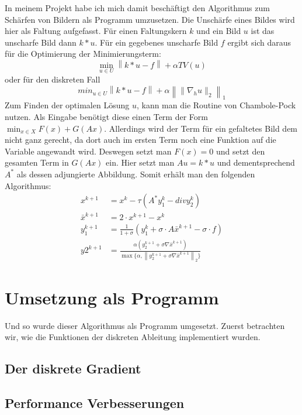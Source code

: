 \documentclass{article}
\theoremstyle{case}
\newcommand{\norm}[1]{\left\lVert#1\right\rVert}
\begin{document}
In meinem Projekt habe ich mich damit beschäftigt den Algorithmus zum Schärfen von Bildern als Programm umzusetzen. Die Unschärfe eines Bildes wird hier als Faltung aufgefasst. Für einen Faltungskern $k$ und ein Bild $u$ ist das unscharfe Bild dann $k*u$. Für ein gegebenes unscharfe Bild $f$ ergibt sich daraus für die Optimierung der Minimierungsterm:
\begin{equation}
\min_{u\in U}\norm{k*u - f} + \alpha TV(u)
\end{equation}
oder für den diskreten Fall
\begin{equation}
min_{u\in U}\norm{k*u - f} + \alpha \norm{\lVert \nabla_{h} u \rVert_{2}}_{1}
\end{equation}
Zum Finden der optimalen Lösung $u$, kann man die Routine von Chambole-Pock nutzen. Als Eingabe benötigt diese einen Term der Form $\min_{x\in X} F(x) + G(Ax)$. Allerdings wird der Term für ein gefaltetes Bild dem nicht ganz gerecht, da dort auch im ersten Term noch eine Funktion auf die Variable angewandt wird. Deswegen setzt man $F(x) = 0$ und setzt den gesamten Term in $G(Ax)$ ein. Hier setzt man $Au = k*u$ und dementsprechend $A^{*}$ als dessen adjungierte Abbildung. Somit erhält man den folgenden Algorithmus:
\begin{align*}
x^{k+1} &= x^{k} - \tau (A^{*}y_{1}^{k} - div y_{2}^{k}) \\
\bar{x}^{k+1} &= 2\cdot x^{k+1} - x^{k} \\
y_{1}^{k+1} &= \frac{1}{1+\sigma} (y_{1}^{k} + \sigma\cdot A \bar{x}^{k+1} - \sigma\cdot f) \\
y{2}^{k+1} &= \frac{\alpha (y_{2}^{k+1} + \sigma \nabla \bar{x}^{k+1} )}{\max\{\alpha, \norm{y_{2}^{k+1} + \sigma \nabla \bar{x}^{k+1} }_{2}\}}
\end{align*}


\section{Umsetzung als Programm}
Und so wurde dieser Algorithmus als Programm umgesetzt.\newline
Zuerst betrachten wir, wie die Funktionen der diskreten Ableitung implementiert wurden.

\subsection{Der diskrete Gradient}

\subsection*{Performance Verbesserungen}
\end{document}
